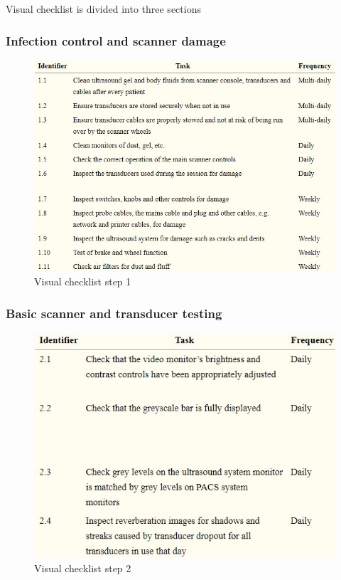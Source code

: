 \documentclass[12pt]{article}
\begin{document}
Visual checklist is divided into three sections

\subsubsection{Infection control and scanner damage}
\begin{figure}[!h]
    \centering
    \includegraphics[width=0.8\linewidth]{vc.jpg}
    \caption{\small{Visual checklist step 1}}
    \label{fig:Visual checklist for US}
\end{figure}

\subsubsection{Basic scanner and transducer testing}
\begin{figure}[!h]
    \centering
    \includegraphics[width=0.8\linewidth]{vc1.jpg}
    \caption{\small{Visual checklist step 2}}
    \label{fig:Visual checklist for US}
\end{figure}
\end{document}
